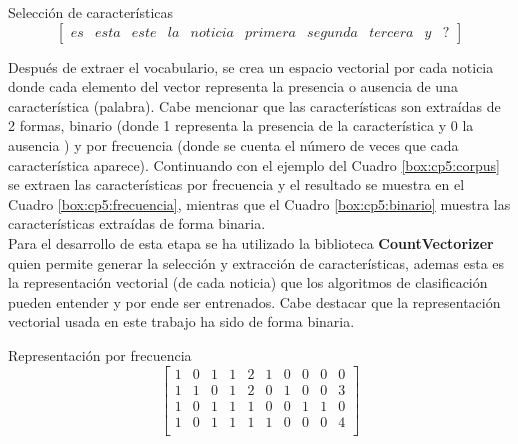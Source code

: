 \begin{mygraybox}[label={box:cp5:caracteristicas}]{Selección de características} 
\begin{equation*}
\begin{bmatrix}
es & esta & este & la & noticia & primera & segunda & tercera & y & ?
\end{bmatrix}
\end{equation*}
\end{mygraybox}




Después de extraer el  vocabulario, se crea un espacio vectorial por cada noticia donde cada elemento del vector representa la presencia o ausencia de una característica (palabra). Cabe mencionar que las características son extraídas de 2 formas, binario (donde 1 representa la presencia de la característica y 0 la ausencia ) y por frecuencia (donde se cuenta el número de veces que cada característica aparece). Continuando con el ejemplo del Cuadro \ref{box:cp5:corpus} se extraen las características por frecuencia y el resultado se muestra en el Cuadro \ref{box:cp5:frecuencia}, mientras que el Cuadro \ref{box:cp5:binario} muestra las características extraídas de forma binaria.\\

Para el desarrollo de esta etapa se ha utilizado la biblioteca \textbf{CountVectorizer} quien permite generar la selección y extracción de características, ademas esta es la representación vectorial (de cada noticia) que los algoritmos de clasificación pueden entender y por ende ser entrenados. Cabe destacar que la representación vectorial usada en este trabajo ha sido de forma binaria.\\

\begin{mygraybox}[label={box:cp5:frecuencia}]{Representación por frecuencia} 
\begin{equation*}
\begin{bmatrix}
1 & 0 & 1 & 1 & 2 & 1 & 0 & 0 & 0 & 0\\
1 & 1 & 0 & 1 & 2 & 0 & 1 & 0 & 0 & 3\\
1 & 0 & 1 & 1 & 1 & 0 & 0 & 1 & 1 & 0\\
1 & 0 & 1 & 1 & 1 & 1 & 0 & 0 & 0 & 4\\
\end{bmatrix}
\end{equation*}
\end{mygraybox}

